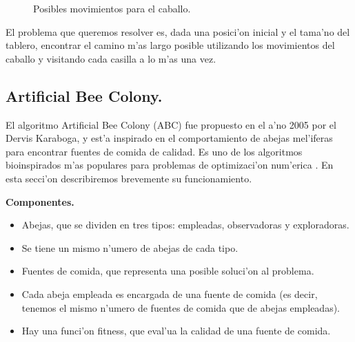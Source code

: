 \documentclass[12pt]{article}
\begin{document}
    \begin{figure}[H]
        \centering
        \caption{Posibles movimientos para el caballo.}
        \label{fig:knight_move}
    \end{figure}



    El problema que queremos resolver es, dada una posici'on inicial y el tama'no del tablero,
    encontrar el camino m'as largo posible utilizando los movimientos del caballo
    y visitando cada casilla a lo m'as una vez.


    \subsection{Artificial Bee Colony.}\label{section:bee_colony}

    El algoritmo Artificial Bee Colony (ABC) fue propuesto en el a'no 2005  por el  Dervis Karaboga,
    y est'a inspirado en el comportamiento de abejas mel'iferas para encontrar fuentes de comida de calidad. Es uno de
    los algoritmos bioinspirados m'as populares para problemas de optimizaci'on num'erica \cite{anan}.
    En esta secci'on describiremos brevemente su funcionamiento.

    \textbf{Componentes.}
    \begin{itemize}
        \setlength\itemsep{0em}
        \item Abejas, que se dividen en tres tipos: empleadas, observadoras y exploradoras.
        \item Se tiene un mismo n'umero de abejas de cada tipo.
        \item Fuentes de comida, que representa una posible soluci'on al problema.
        \item Cada abeja empleada es encargada de una fuente de comida (es decir, tenemos el mismo n'umero de fuentes
                de comida que de abejas empleadas).
        \item Hay una funci'on fitness, que eval'ua la calidad de una fuente de comida.
    \end{itemize}
\end{document}
